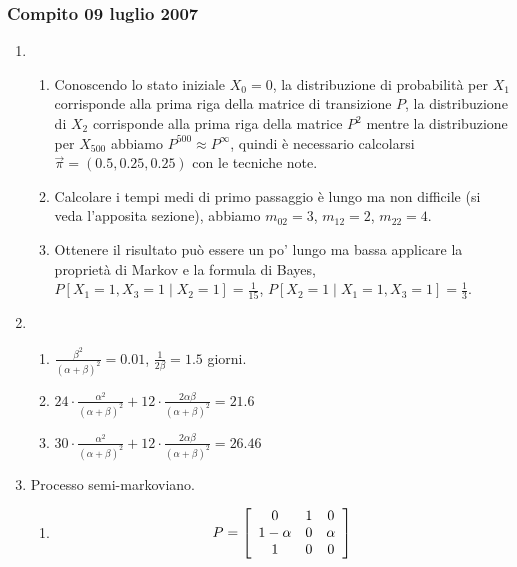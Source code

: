 \documentclass{article}
\begin{document}
\subsubsection{Compito 09 luglio 2007}
\begin{enumerate}
    \item\begin{enumerate}[label=\alph*)]
        \item Conoscendo lo stato iniziale $X_0 = 0$, la distribuzione di probabilità per $X_1$ corrisponde alla prima riga della matrice di transizione $P$, la distribuzione di $X_2$ corrisponde alla prima riga della matrice $P^2$ mentre la distribuzione per $X_{500}$ abbiamo $P^{500} \approx P^{\infty}$, quindi è necessario calcolarsi $\vec{\pi} = (0.5,0.25,0.25)$ con le tecniche note. 

        \item Calcolare i tempi medi di primo passaggio è lungo ma non difficile (si veda l'apposita sezione), abbiamo $m_{02} = 3$, $m_{12} = 2$, $m_{22} = 4$.  

        \item Ottenere il risultato può essere un po' lungo ma bassa applicare la proprietà di Markov e la formula di Bayes, $P[X_1 = 1, X_3 = 1\mid X_2 = 1] = \frac{1}{15}$, $P[X_2 = 1 \mid X_1 = 1, X_3 = 1] = \frac{1}{3}$.
    \end{enumerate}
    
    \item\begin{enumerate}[label=\alph*)]
        \item $\frac{\beta^2}{(\alpha + \beta)^2} = 0.01$, $\frac{1}{2\beta} = 1.5$ giorni.
        \item $24\cdot\frac{\alpha^2}{(\alpha + \beta)^2}+12\cdot\frac{2\alpha\beta}{(\alpha + \beta)^2} = 21.6$
        \item $30\cdot\frac{\alpha^2}{(\alpha + \beta)^2}+12\cdot\frac{2\alpha\beta}{(\alpha + \beta)^2} = 26.46$
    \end{enumerate}
    
    \item Processo semi-markoviano.
    \begin{enumerate}[label=\alph*)]
        \item \begin{align*}
        P = \left[\begin{array}{c c c}
        0 & 1 & 0\\1-\alpha & 0 & \alpha\\1 & 0 & 0
        \end{array}\right]
        \end{align*}


\end{enumerate}
\end{enumerate}
\end{document}
